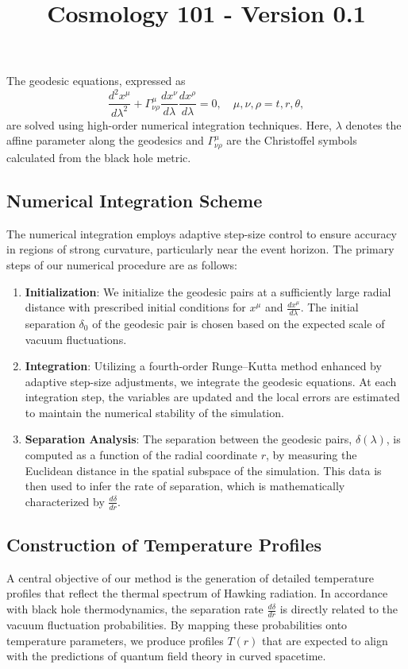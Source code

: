 \documentclass{article}\usepackage{graphicx} \usepackage{amsmath} \usepackage{colortbl}\title{Cosmology 101 - Version 0.1}
\begin{document}
The geodesic equations, expressed as
\begin{equation}
\frac{d^2x^{\mu}}{d\lambda^2}+\Gamma^{\mu}_{\nu\rho}\frac{dx^{\nu}}{d\lambda}\frac{dx^{\rho}}{d\lambda}=0, \quad \mu,\nu,\rho=t, r, \theta,
\end{equation}
are solved using high-order numerical integration techniques. Here, $\lambda$ denotes the affine parameter along the geodesics and $\Gamma^{\mu}_{\nu\rho}$ are the Christoffel symbols calculated from the black hole metric. 

\subsection{Numerical Integration Scheme}
The numerical integration employs adaptive step-size control to ensure accuracy in regions of strong curvature, particularly near the event horizon. The primary steps of our numerical procedure are as follows:
\begin{enumerate}
    \item \textbf{Initialization}: We initialize the geodesic pairs at a sufficiently large radial distance with prescribed initial conditions for $x^{\mu}$ and $\frac{dx^{\mu}}{d\lambda}$. The initial separation $\delta_0$ of the geodesic pair is chosen based on the expected scale of vacuum fluctuations.
    \item \textbf{Integration}: Utilizing a fourth-order Runge–Kutta method enhanced by adaptive step-size adjustments, we integrate the geodesic equations. At each integration step, the variables are updated and the local errors are estimated to maintain the numerical stability of the simulation.
    \item \textbf{Separation Analysis}: The separation between the geodesic pairs, $\delta(\lambda)$, is computed as a function of the radial coordinate $r$, by measuring the Euclidean distance in the spatial subspace of the simulation. This data is then used to infer the rate of separation, which is mathematically characterized by $\frac{d\delta}{dr}$.
\end{enumerate}

\subsection{Construction of Temperature Profiles}
A central objective of our method is the generation of detailed temperature profiles that reflect the thermal spectrum of Hawking radiation. In accordance with black hole thermodynamics, the separation rate $\frac{d\delta}{dr}$ is directly related to the vacuum fluctuation probabilities. By mapping these probabilities onto temperature parameters, we produce profiles $T(r)$ that are expected to align with the predictions of quantum field theory in curved spacetime.
\end{document}
